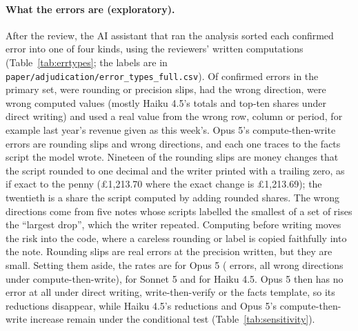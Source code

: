 \documentclass[11pt]{article}
\begin{document}
\paragraph{What the errors are (exploratory).} After the review, the AI assistant that ran the analysis sorted each confirmed error into one of four kinds, using the reviewers' written computations (Table~\ref{tab:errtypes}; the labels are in \texttt{paper/adjudication/error\_types\_full.csv}). Of \ErrTotal{} confirmed errors in the primary set, \ErrRoundTotal{} were rounding or precision slips, \ErrDirTotal{} had the wrong direction, \ErrValueTotal{} were wrong computed values (mostly Haiku 4.5's totals and top-ten shares under direct writing) and \ErrEntityTotal{} used a real value from the wrong row, column or period, for example last year's revenue given as this week's. Opus 5's compute-then-write errors are \ErrRoundOpusTwo{} rounding slips and \ErrDirOpusTwo{} wrong directions, and each one traces to the facts script the model wrote. Nineteen of the rounding slips are money changes that the script rounded to one decimal and the writer printed with a trailing zero, as if exact to the penny (\pounds1,213.70 where the exact change is \pounds1,213.69); the twentieth is a share the script computed by adding rounded shares. The wrong directions come from five notes whose scripts labelled the smallest of a set of rises the ``largest drop'', which the writer repeated. Computing before writing moves the risk into the code, where a careless rounding or label is copied faithfully into the note. Rounding slips are real errors at the precision written, but they are small. Setting them aside, the rates are \SubstOpusAll{} for Opus 5 (\SubstNOpusAll{} errors, all wrong directions under compute-then-write), \SubstSonnetAll{} for Sonnet 5 and \SubstHaikuAll{} for Haiku 4.5. Opus 5 then has no error at all under direct writing, write-then-verify or the facts template, so its reductions disappear, while Haiku 4.5's reductions and Opus 5's compute-then-write increase remain under the conditional test (Table~\ref{tab:sensitivity}).
\end{document}
